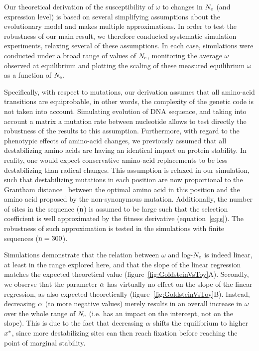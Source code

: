 Our theoretical derivation of the susceptibility of $\omega$ to changes in $N_{\mathrm{e}}$ (and expression level) is based on several simplifying assumptions about the evolutionary model and makes multiple approximations.
In order to test the robustness of our main result, we therefore conducted systematic simulation experiments, relaxing several of these assumptions.
In each case, simulations were conducted under a broad range of values of $N_{\mathrm{e}}$, monitoring the average $\omega$ observed at equilibrium and plotting the scaling of these measured equilibrium $\omega$ as a function of $N_{\mathrm{e}}$.

Specifically, with respect to mutations, our derivation assumes that all amino-acid {transitions} are equiprobable, in other words, the complexity of the genetic code is not taken into account.
Simulating evolution of \acrshort{DNA} sequence, and taking into account a matrix a mutation rate between nucleotide allows to test directly the robustness of the results to this assumption.
Furthermore, with regard to the phenotypic effects of amino-acid changes, we previously assumed that all destabilizing amino acids are having an identical impact on protein stability.
In reality, one would expect conservative amino-acid replacements to be less destabilizing than radical changes.
This assumption is relaxed in our simulation, such that destabilizing mutations in each position are now proportional to the Grantham distance~\citep{Grantham1974} between the optimal amino acid in this position and the amino acid proposed by the non-synonymous mutation.
Additionally, the number of sites in the sequence ($\text{n}$) is assumed to be large such that the selection coefficient is well approximated by the fitness derivative (equation~\ref{eq:s}).
The robustness of such approximation is tested in the simulations with finite sequences ($\text{n}=300$).

Simulations demonstrate that the relation between $\omega$ and log-$N_{\mathrm{e}}$ is indeed linear, at least in the range explored here, and that the slope of the linear regression matches the expected theoretical value (figure~\ref{fig:GoldsteinVsToy}A).
Secondly, we observe that the parameter $\alpha$ has virtually no effect on the slope of the linear regression, as also expected theoretically (figure~\ref{fig:GoldsteinVsToy}B).
Instead, decreasing $\alpha$ (to more negative values) merely results in an overall increase in $\omega$ over the whole range of $N_{\mathrm{e}}$ (i.e. has an impact on the intercept, not on the slope).
This is due to the fact that decreasing $\alpha$ shifts the equilibrium to higher $x^{*}$, since more destabilizing sites can then reach fixation before reaching the point of marginal stability.

